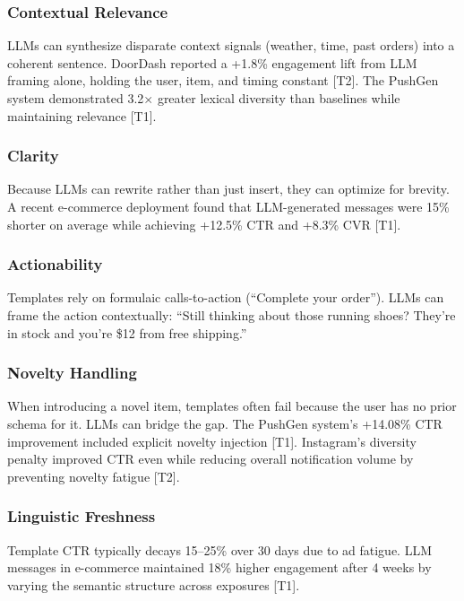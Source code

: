 \documentclass[sigconf]{acmart}
\begin{document}
\subsubsection{Contextual Relevance}
LLMs can synthesize disparate context signals (weather, time, past orders) into a coherent sentence. DoorDash reported a +1.8\% engagement lift from LLM framing alone, holding the user, item, and timing constant \cite{sinha2024doordash} [T2]. The PushGen system demonstrated 3.2$\times$ greater lexical diversity than baselines while maintaining relevance \cite{bie2026pushgen} [T1].

\subsubsection{Clarity}
Because LLMs can rewrite rather than just insert, they can optimize for brevity. A recent e-commerce deployment found that LLM-generated messages were 15\% shorter on average while achieving +12.5\% CTR and +8.3\% CVR \cite{acm2025ecommerce} [T1].

\subsubsection{Actionability}
Templates rely on formulaic calls-to-action (``Complete your order''). LLMs can frame the action contextually: ``Still thinking about those running shoes? They're in stock and you're \$12 from free shipping.''

\subsubsection{Novelty Handling}
When introducing a novel item, templates often fail because the user has no prior schema for it. LLMs can bridge the gap. The PushGen system's +14.08\% CTR improvement included explicit novelty injection \cite{bie2026pushgen} [T1]. Instagram's diversity penalty improved CTR even while reducing overall notification volume by preventing novelty fatigue \cite{sun2025ranking} [T2].

\subsubsection{Linguistic Freshness}
Template CTR typically decays 15--25\% over 30 days due to ad fatigue. LLM messages in e-commerce maintained 18\% higher engagement after 4 weeks by varying the semantic structure across exposures \cite{acm2025ecommerce} [T1].
\end{document}

